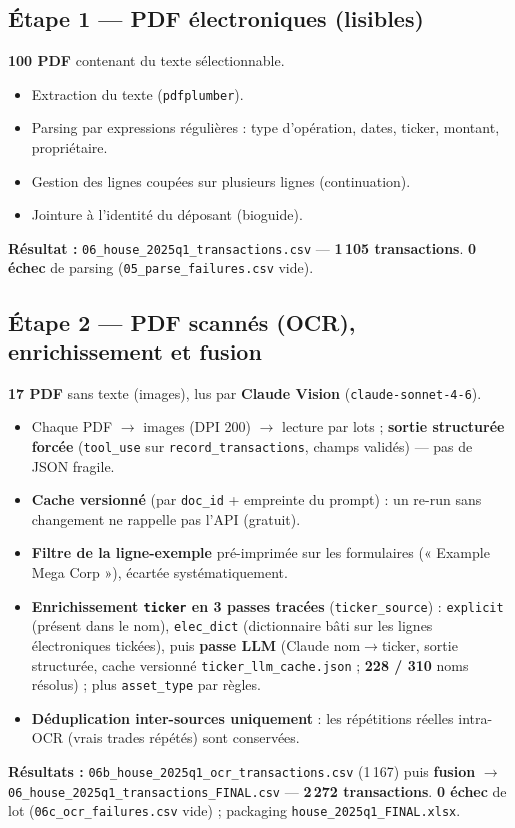 \documentclass[11pt,a4paper]{article}
\newcommand{\file}[1]{\texttt{\small #1}}
\newcommand{\nb}[1]{\textbf{#1}}
\begin{document}
\subsection{Étape 1 --- PDF électroniques (lisibles)}
\textbf{100 PDF} contenant du texte sélectionnable.
\begin{itemize}
  \item Extraction du texte (\texttt{pdfplumber}).
  \item Parsing par expressions régulières : type d'opération, dates, ticker, montant, propriétaire.
  \item Gestion des lignes coupées sur plusieurs lignes (continuation).
  \item Jointure à l'identité du déposant (bioguide).
\end{itemize}
\textbf{Résultat :} \file{06\_house\_2025q1\_transactions.csv} --- \nb{1\,105 transactions}.
\textbf{0 échec} de parsing (\file{05\_parse\_failures.csv} vide).

\subsection{Étape 2 --- PDF scannés (OCR), enrichissement et fusion}
\textbf{17 PDF} sans texte (images), lus par \textbf{Claude Vision} (\texttt{claude-sonnet-4-6}).
\begin{itemize}
  \item Chaque PDF $\to$ images (DPI 200) $\to$ lecture par lots ; \textbf{sortie structurée forcée}
        (\texttt{tool\_use} sur \texttt{record\_transactions}, champs validés) --- pas de JSON fragile.
  \item \textbf{Cache versionné} (par \texttt{doc\_id} + empreinte du prompt) : un re-run sans
        changement ne rappelle pas l'API (gratuit).
  \item \textbf{Filtre de la ligne-exemple} pré-imprimée sur les formulaires (« Example Mega Corp »),
        écartée systématiquement.
  \item \textbf{Enrichissement \texttt{ticker} en 3 passes tracées} (\texttt{ticker\_source}) :
        \texttt{explicit} (présent dans le nom), \texttt{elec\_dict} (dictionnaire bâti sur les lignes
        électroniques tickées), puis \textbf{passe LLM} (Claude nom$\to$ticker, sortie structurée,
        cache versionné \file{ticker\_llm\_cache.json} ; \nb{228 / 310} noms résolus) ; plus
        \texttt{asset\_type} par règles.
  \item \textbf{Déduplication inter-sources uniquement} : les répétitions réelles intra-OCR
        (vrais trades répétés) sont conservées.
\end{itemize}
\textbf{Résultats :} \file{06b\_house\_2025q1\_ocr\_transactions.csv} (1\,167) puis \textbf{fusion}
$\to$ \file{06\_house\_2025q1\_transactions\_FINAL.csv} --- \nb{2\,272 transactions}.
\textbf{0 échec} de lot (\file{06c\_ocr\_failures.csv} vide) ; packaging \file{house\_2025q1\_FINAL.xlsx}.
\end{document}
